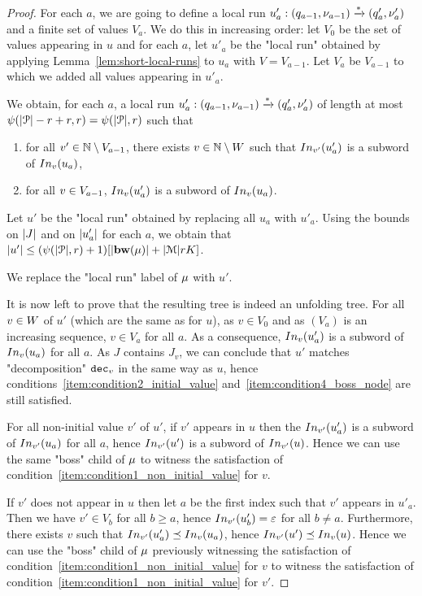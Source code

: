 \begin{proof}
	For each $a$, we are going to define a local run $u'_a : (q_{a-1}, \nu_{a-1}) \xrightarrow{*} (q'_a, \nu'_a)$ and a finite set of values $V_a$.
	We do this in increasing order: let $V_0$ be the set of values appearing in $u$ and for each $a$, let $u'_a$ be the "local run" obtained by applying Lemma~\ref{lem:short-local-runs} to $u_a$ with $V=V_{a-1}$. Let $V_a$ be $V_{a-1}$ to which we added all values appearing in $u'_{a}$.
	
	We obtain, for each $a$, a local run $u'_a : (q_{a-1}, \nu_{a-1}) \xrightarrow{*} (q'_a, \nu'_a)$ of length at most $\psi(|\mathcal{P}|-r+r, r) = \psi(|\mathcal{P}|, r)$ such that 
	\begin{enumerate}
		\item for all $v' \in \mathbb{N} \setminus V_{a-1}$, there exists $v \in \mathbb{N} \setminus W$ such that $\vinput{\aval'}{\localrun'_a}$ is a subword of $\vinput{\aval}{\localrun_a}$,
		\item for all $v \in V_{a-1}$, $\vinput{\aval}{\localrun'_a}$ is a subword of $\vinput{\aval}{\localrun_a}$. 
	\end{enumerate}
Let $u'$ be the "local run" obtained by replacing all $u_a$ with $u'_a$. Using the bounds on $|J|$ and on $|u'_a|$ for each $a$, we obtain that $\size{u'} \leq (\towerfun(\size{\prot}, r) +1) \Large[\size{\bosslabel{\node}}+ \size{\messages}rK\Large]$.

We replace the "local run" label of $\mu$ with $u'$. 


It is now left to prove that the resulting tree is indeed an unfolding tree.
	For all $v \in W$ of $u'$ (which are the same as for $u$), as $v \in V_0$ and as $(V_a)$ is an increasing sequence, $v \in V_a$ for all $a$. As a consequence, $\vinput{\aval}{\localrun'_a}$ is a subword of $\vinput{\aval}{\localrun_a}$ for all $a$. As $J$ contains $J_v$, we can conclude that $u'$ matches "decomposition" $\mathtt{dec}_v$ in the same way as $u$, hence conditions~\ref{item:condition2_initial_value} and~\ref{item:condition4_boss_node} are still satisfied.
	
	For  all non-initial value $v'$ of $u'$, if $v'$ appears in $u$ then the $\vinput{\aval'}{\localrun'_a}$ is a subword of $\vinput{\aval'}{\localrun_a}$ for all $a$, hence $\vinput{\aval'}{\localrun'}$ is a subword of $\vinput{\aval'}{\localrun}$. Hence we can use the same "boss" child of $\mu$ to witness the satisfaction of condition~\ref{item:condition1_non_initial_value} for $v$.
	
	If $v'$ does not appear in $u$ then let $a$ be the first index such that $v'$ appears in $u'_a$. Then we have $v' \in V_b$ for all $b \geq a$, hence $\vinput{v'}{u'_b} = \epsilon$ for all $b\neq a$. Furthermore, there exists $v$ such that $\vinput{v'}{u'_a} \subword \vinput{v}{u_a}$, hence $\vinput{v'}{u'} \subword \vinput{v}{u}$. Hence we can use the "boss" child of $\mu$ previously witnessing the satisfaction of condition~\ref{item:condition1_non_initial_value} for $v$ to witness the satisfaction of condition~\ref{item:condition1_non_initial_value} for $v'$.
	

\end{proof}
